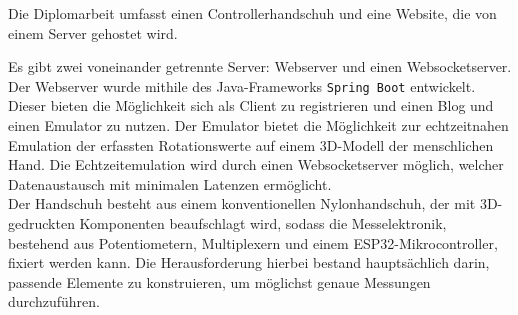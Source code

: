 Die Diplomarbeit umfasst einen Controllerhandschuh und eine Website, die von einem Server gehostet wird. 

Es gibt zwei voneinander getrennte Server: Webserver und einen Websocketserver. Der Webserver wurde mithile des Java-Frameworks 
\texttt{Spring Boot} entwickelt. Dieser bieten die Möglichkeit sich als Client zu registrieren und einen Blog und einen Emulator zu nutzen. Der Emulator bietet die Möglichkeit zur echtzeitnahen Emulation der erfassten Rotationswerte auf einem 3D-Modell der menschlichen Hand.\newline
Die Echtzeitemulation wird durch einen Websocketserver möglich, welcher Datenaustausch mit minimalen Latenzen ermöglicht.\\
Der Handschuh besteht aus einem konventionellen Nylonhandschuh, der mit 3D-gedruckten Komponenten beaufschlagt wird, sodass die 
Messelektronik, bestehend aus Potentiometern, Multiplexern und einem ESP32-Mikrocontroller, fixiert werden kann. Die Herausforderung
hierbei bestand hauptsächlich darin, passende Elemente zu konstruieren, um möglichst genaue Messungen durchzuführen. 
\\

